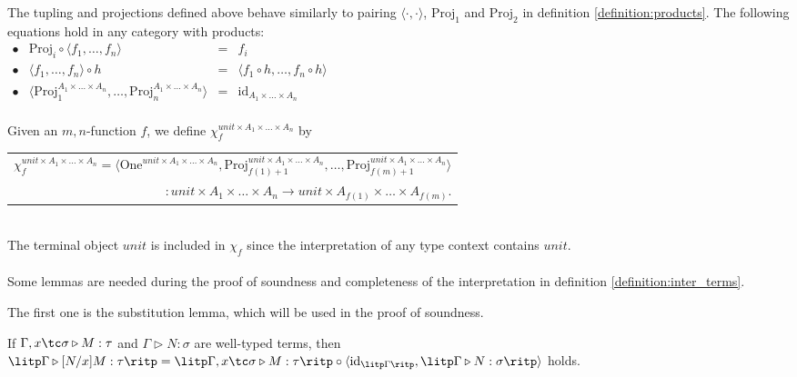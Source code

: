 The tupling and projections defined above behave similarly to pairing $ \langle \cdot , \cdot \rangle $, $ \text{Proj}_1 $ and $ \text{Proj}_2 $ in definition \ref{definition:products}. The following equations hold in any category with products:\\[5pt]
$
\begin{array}{rlcl}
\bullet & \text{Proj}_i \circ \langle f_1, \ldots , f_n \rangle & = & f_i \\[5pt]
\bullet & \langle f_1, \ldots , f_n \rangle \circ h & = & \langle f_1 \circ h, \ldots , f_n \circ h \rangle \\[5pt]
\bullet & \langle \text{Proj}_1^{A_1 \times \ldots \times A_n}, \ldots , \text{Proj}_n^{A_1 \times \ldots \times A_n} \rangle & = & \text{id}_{A_1 \times \ldots \times A_n} \\[10pt]
\end{array}
$

Given an $m,n$-function $ f $, we define $ \chi_f^{unit \times A_1 \times \ldots \times A_n} $ by \\[3pt]
\begin{tabular}{m{}}
$
\chi_f^{unit \times A_1 \times \ldots \times A_n} = \langle \text{One}^{unit \times A_1 \times \ldots \times A_n}, \text{Proj}_{f(1)+1}^{unit \times A_1 \times \ldots \times A_n}, \ldots , \text{Proj}_{f(m)+1}^{unit \times A_1 \times \ldots \times A_n} \rangle
$ \\[3pt]
\multicolumn{1}{r}{$ : unit \times A_1 \times \ldots \times A_n \to unit \times A_{f(1)} \times \ldots \times A_{f(m)} $.}
\end{tabular} \\[3pt]
The terminal object $ unit $ is included in $ \chi_f $ since the interpretation of any type context contains $ unit $.
\\
\\
Some lemmas are needed during the proof of soundness and completeness of the interpretation in definition \ref{definition:inter_terms}.

The first one is the substitution lemma, which will be used in the proof of soundness.

\begin{lemma}
\label{lemma:subs}
If $ \Gamma , x \tc \sigma \triangleright M: \tau $ and $ \Gamma \triangleright N: \sigma $ are well-typed terms, then $ \litp \Gamma \triangleright [N/x]M: \tau \ritp = \litp \Gamma , x \tc \sigma \triangleright M: \tau \ritp \circ \langle \textnormal{id}_{\litp \Gamma \ritp} , \litp \Gamma \triangleright N: \sigma \ritp \rangle $ holds.
\end{lemma}

